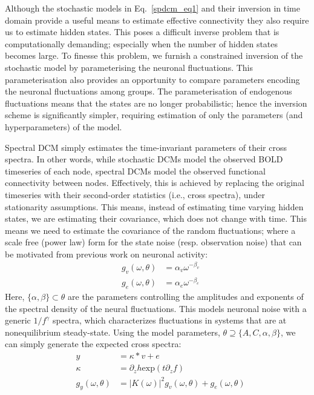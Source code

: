 Although the stochastic models in  Eq.~\ref{spdcm_eq1} and their inversion in time domain provide a useful means to estimate effective connectivity they also require us to estimate hidden states. This poses a difficult inverse problem that is computationally demanding; especially when the number of hidden states becomes large. To finesse this problem, we furnish a constrained inversion of the stochastic model by parameterising the neuronal fluctuations. This parameterisation also provides an opportunity to compare parameters encoding the neuronal fluctuations among groups. The parameterisation of endogenous fluctuations means that the states are no longer probabilistic; hence the inversion scheme is significantly simpler, requiring estimation of only the parameters (and hyperparameters) of the model.

Spectral DCM simply estimates the time-invariant parameters of their cross spectra. In other words, while stochastic DCMs model the observed BOLD timeseries of each node, spectral DCMs model the observed functional connectivity between nodes. Effectively, this is achieved by replacing the original timeseries with their second-order statistics (i.e., cross spectra), under stationarity assumptions. This means, instead of estimating time varying hidden states, we are estimating their covariance, which does not change with time. This means we need to estimate the covariance of the random fluctuations; where a scale free (power law) form for the state noise (resp. observation noise) that can be motivated from previous work on neuronal activity:
\begin{eqnarray}\label{spdcm_eq4}
& g_{v}(\omega,\theta) & = \alpha_{v}\omega^{-\beta_{v}}\\ \nonumber
& g_{e}(\omega,\theta) & = \alpha_{e}\omega^{-\beta_{e}}
\end{eqnarray}
Here, $\{\alpha,\beta\}\subset \theta$ are the parameters controlling the amplitudes and exponents of the spectral density of the neural fluctuations. This models neuronal noise with a generic $1/f^{\gamma}$ spectra, which characterizes fluctuations in systems that are at nonequilibrium steady-state. Using the model parameters, $\theta \supseteq \{A,C,\alpha, \beta\}$, we can simply generate the expected cross spectra:
\begin{eqnarray}\label{spdcm_eq5}
& y & = \kappa \ast v + e\\ \nonumber
& \kappa & = \partial_z h \mathrm{exp} (t \partial_z f ) \\ \nonumber
& g_{y}(\omega,\theta) & = |K(\omega)|^2 g_{v}(\omega,\theta) + g_{e}(\omega,\theta)
\end{eqnarray}
